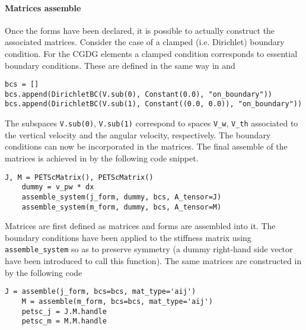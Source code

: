 \paragraph{Matrices assemble}
Once the forms have been declared, it is possible to actually construct the associated matrices. Consider the case of a clamped (i.e. Dirichlet) boundary condition. For the CGDG elements a clamped condition corresponds to essential boundary conditions. These are defined in the same way in \fenics and \firedrake
\begin{tcolorbox}[title = Dirichlet boundary conditions, coltitle=white, breakable, size=fbox, boxrule=1pt, pad at break*=1mm, enlarge top by=0.25em, enlarge bottom by=0.5em]
\begin{Verbatim}[tabsize=4]
bcs = []
bcs.append(DirichletBC(V.sub(0), Constant(0.0), "on_boundary"))
bcs.append(DirichletBC(V.sub(1), Constant((0.0, 0.0)), "on_boundary"))
\end{Verbatim}
\end{tcolorbox}
The subspaces \verb|V.sub(0)|, \verb|V.sub(1)| correspond to spaces \verb|V_w|, \verb|V_th| associated to the vertical velocity and the angular velocity, respectively. The boundary conditions can now be incorporated in the matrices. The final assemble of the matrices is achieved in \fenics by the following code snippet.
\begin{tcolorbox}[title = Matrices assembly in  \fenics, coltitle=black, breakable, size=fbox, boxrule=1pt, pad at break*=1mm, colframe=red, enlarge top by=0.25em, enlarge bottom by=0.5em]
	\begin{Verbatim}[tabsize=4]
	J, M = PETScMatrix(), PETScMatrix()
	dummy = v_pw * dx
	assemble_system(j_form, dummy, bcs, A_tensor=J)
	assemble_system(m_form, dummy, bcs, A_tensor=M)
	\end{Verbatim}
\end{tcolorbox}
Matrices are first defined as {} matrices and forms are assembled into it. The boundary conditions have been applied to the stiffness matrix using \verb|assemble_system| so as to preserve symmetry (a dummy right-hand side vector have been introduced to call this function). The same matrices are constructed in \firedrake by the following code
\begin{tcolorbox}[title = Matrices assembly in  \firedrake, coltitle=black, breakable, size=fbox, boxrule=1pt, pad at break*=1mm, colframe=cyan, enlarge top by=0.25em, enlarge bottom by=0.5em]
	\begin{Verbatim}[tabsize=4]
	J = assemble(j_form, bcs=bcs, mat_type='aij')
	M = assemble(m_form, bcs=bcs, mat_type='aij')
	petsc_j = J.M.handle
	petsc_m = M.M.handle
	\end{Verbatim}
\end{tcolorbox}
